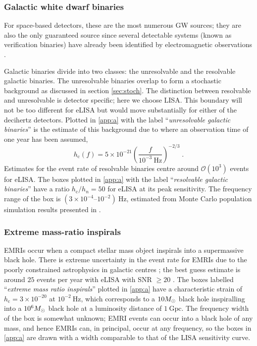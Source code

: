 \subsubsection{Galactic white dwarf binaries} \label{sec:GB}

For space-based detectors, these are the most numerous GW sources; they are also the only guaranteed source since several detectable systems (known as verification binaries) have already been identified by electromagnetic observations \citep{2006CQGra..23S.809S}.

Galactic binaries divide into two classes: the unresolvable and the resolvable galactic binaries. The unresolvable binaries overlap to form a stochastic background as discussed in section \ref{sec:stoch}. The distinction between resolvable and unresolvable is detector specific; here we choose LISA. This boundary will not be too different for eLISA but would move substantially for either of the decihertz detectors. Plotted in \ref{app:a} with the label ``\emph{unresolvable galactic binaries}'' is the estimate of this background due to \citet{Nelemans} where an observation time of one year has been assumed,
\begin{equation}
h_\mathrm{c}(f)= 5\times 10^{-21} \left(\frac{f}{10^{-3}~\mathrm{Hz}}\right)^{-2/3} \; .
 \end{equation}
Estimates for the event rate of resolvable binaries centre around ${\mathcal{O}}(10^{3})$ events for eLISA. The boxes plotted in \ref{app:a} with the label ``\emph{resolvable galactic binaries}'' have a ratio $h_\mathrm{c}/h_{n}=50$ for eLISA at its peak sensitivity. The frequency range of the box is $\left(3\times10^{-4}\right.$--$\left.10^{-2}\right)~\mathrm{Hz}$, estimated from Monte Carlo population simulation results presented in \citet{Amaro-Seoane-et-al}.

\subsubsection{Extreme mass-ratio inspirals}

EMRIs occur when a compact stellar mass object inspirals into a supermassive black hole. There is extreme uncertainty in the event rate for EMRIs due to the poorly constrained astrophysics in galactic centres \citep[e.g.,][]{Merritt2011}; the best guess estimate is around $25$ events per year with eLISA with SNR $\ge 20$ \citep{TheGravitationalUniverse}. The boxes labelled ``\emph{extreme mass ratio inspirals}'' plotted in \ref{app:a} have a characteristic strain of $h_\mathrm{c}=3\times 10^{-20}$ at $10^{-2}~\mathrm{Hz}$, which corresponds to a $10M_{ \odot }$ black hole inspiralling into a $10^{6}M_{ \odot }$ black hole at a luminosity distance of $1~\mathrm{Gpc}$. The frequency width of the box is somewhat unknown; EMRI events can occur into a black hole of any mass, and hence EMRIs can, in principal, occur at any frequency, so the boxes in \ref{app:a} are drawn with a width comparable to that of the LISA sensitivity curve.




